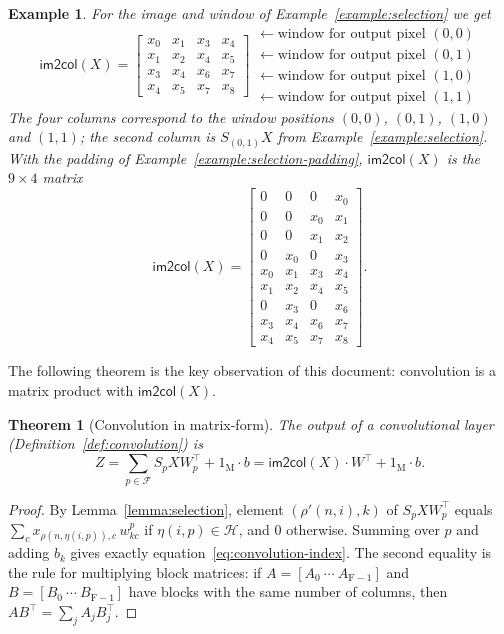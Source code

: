 \documentclass[twoside,11pt]{article}
\newtheorem{theorem}{Theorem}
\newtheorem{example}{Example}
\newcommand{\const}[1]{\ensuremath{\mathrm{#1}}} %
\newcommand{\func}[1]{\ensuremath{\textsf{#1}}}  %
\newcommand{\Fs}{\const{F}}          %
\newcommand{\im}{\func{im2col}}
\newcommand{\Pos}{\mathcal{F}}       %
\newcommand{\pix}{\mathcal{H}}       %
\begin{document}
\begin{example} \label{example:im2col}
For the image and window of Example~\ref{example:selection} we get
\[
\im(X) =
\begin{bmatrix}
x_0 & x_1 & x_3 & x_4 \\
x_1 & x_2 & x_4 & x_5 \\
x_3 & x_4 & x_6 & x_7 \\
x_4 & x_5 & x_7 & x_8
\end{bmatrix}
\begin{matrix}
\leftarrow \text{window for output pixel } (0,0) \\
\leftarrow \text{window for output pixel } (0,1) \\
\leftarrow \text{window for output pixel } (1,0) \\
\leftarrow \text{window for output pixel } (1,1)
\end{matrix}
\]
The four columns correspond to the window positions $(0,0)$, $(0,1)$, $(1,0)$ and $(1,1)$; the second column is $S_{(0,1)} X$ from Example~\ref{example:selection}.
With the padding of Example~\ref{example:selection-padding}, $\im(X)$ is the $9 \times 4$ matrix
\[
\im(X) =
\begin{bmatrix}
0 & 0 & 0 & x_0 \\
0 & 0 & x_0 & x_1 \\
0 & 0 & x_1 & x_2 \\
0 & x_0 & 0 & x_3 \\
x_0 & x_1 & x_3 & x_4 \\
x_1 & x_2 & x_4 & x_5 \\
0 & x_3 & 0 & x_6 \\
x_3 & x_4 & x_6 & x_7 \\
x_4 & x_5 & x_7 & x_8
\end{bmatrix}.
\]
\end{example}

The following theorem is the key observation of this document: convolution is a matrix product with $\im(X)$.

\begin{theorem}[Convolution in matrix-form] \label{theorem:convolution}
The output of a convolutional layer (Definition~\ref{def:convolution}) is
\[
Z = \sum_{p \in \Pos} S_p X W_p^\top + 1_\const{M} \cdot b = \im(X) \cdot W^\top + 1_\const{M} \cdot b.
\]
\end{theorem}
\begin{proof}
By Lemma~\ref{lemma:selection}, element $(\rho'(n,i), k)$ of $S_p X W_p^\top$ equals $\sum_c x_{\rho(n,\eta(i,p)), c}\, w^p_{kc}$ if $\eta(i,p) \in \pix$, and 0 otherwise.
Summing over $p$ and adding $b_k$ gives exactly equation~\eqref{eq:convolution-index}.
The second equality is the rule for multiplying block matrices: if $A = [A_0 \ \cdots \ A_{\Fs-1}]$ and $B = [B_0 \ \cdots \ B_{\Fs-1}]$ have blocks with the same number of columns, then $A B^\top = \sum_j A_j B_j^\top$.
\end{proof}
\end{document}
